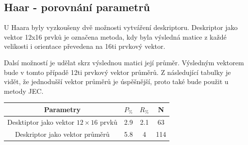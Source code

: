 \documentclass[czech,BP]{thesiskiv}
\begin{document}
\subsection{Haar - porovnání parametrů}
U Haara byly vyzkoušeny dvě možnosti vytváření deskriptoru. Deskriptor jako vektor 12x16 prvků je označena metoda, kdy byla výsledná matice z každé velikosti i orientace převedena na 16ti prvkový vektor. 
\par Dalsí možností je udělat skrz výslednou matici její průměr. Výsledným vektorem bude v tomto případě 12ti prvkový vektor průměrů. Z následující tabulky je vidět, že jednodušší vektor průměrů je úspěšnější, proto také bude použit u metody JEC.
\newpage
\begin{center}
	\begin{tabular}{ |c|c|c|c| }
		\hline
		Parametry & $P_{\%}$  & $R_{\%}$ & N \\ \hline
		Desktiptor jako vektor $12 \times 16$ prvků & 2.9 & 2.1 & 63 \\ \hline
		Deskriptor jako vektor průměrů & 5.8 & 4 & 114 \\ \hline 	
	\end{tabular}
\end{center}
\end{document}
